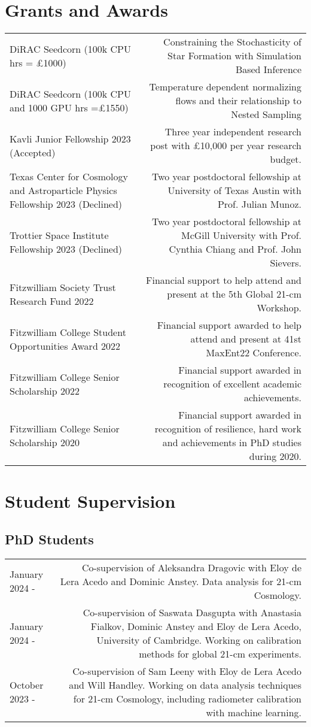 \documentclass{article}
\begin{document}
\section*{Grants and Awards}

\begin{tabular}{l!{\vrule}r}
    DiRAC Seedcorn (100k CPU hrs = £1000) & Constraining the Stochasticity of Star Formation with Simulation Based Inference \\
    DiRAC Seedcorn (100k CPU and 1000 GPU hrs =£1550) & Temperature dependent normalizing flows and their relationship to Nested Sampling \\
    Kavli Junior Fellowship 2023 (Accepted) & Three year independent research post with £10,000 per year research budget. \\
    Texas Center for Cosmology and Astroparticle Physics Fellowship 2023 (Declined) & Two year postdoctoral fellowship at University of Texas Austin with Prof. Julian Munoz. \\
    Trottier Space Institute Fellowship 2023 (Declined) & Two year postdoctoral fellowship at McGill University with Prof. Cynthia Chiang and Prof. John Sievers. \\
    Fitzwilliam Society Trust Research Fund 2022 & Financial support to help attend and present at the 5th Global 21-cm Workshop. \\
	Fitzwilliam College Student Opportunities Award 2022 & Financial support awarded to help attend and present at 41st MaxEnt22 Conference. \\
	Fitzwilliam College Senior Scholarship 2022 & Financial support awarded in recognition of excellent academic achievements. \\
	Fitzwilliam College Senior Scholarship 2020 & Financial support awarded in recognition of resilience, hard work and achievements in PhD studies during 2020.
\end{tabular}

\section*{Student Supervision}

\subsection*{PhD Students}

\begin{tabular}{L!{\vrule}R}
    January 2024 - & Co-supervision of Aleksandra Dragovic with Eloy de Lera Acedo and Dominic Anstey. Data analysis for 21-cm Cosmology. \\
    January 2024 - & Co-supervision of Saswata Dasgupta with Anastasia Fialkov, Dominic Anstey and Eloy de Lera Acedo, University of Cambridge. Working on calibration methods for global 21-cm experiments. \\
	October 2023 - & Co-supervision of Sam Leeny with Eloy de Lera Acedo and Will Handley. Working on data analysis techniques for 21-cm Cosmology, including  radiometer calibration with machine learning. \\
\end{tabular}
\end{document}
